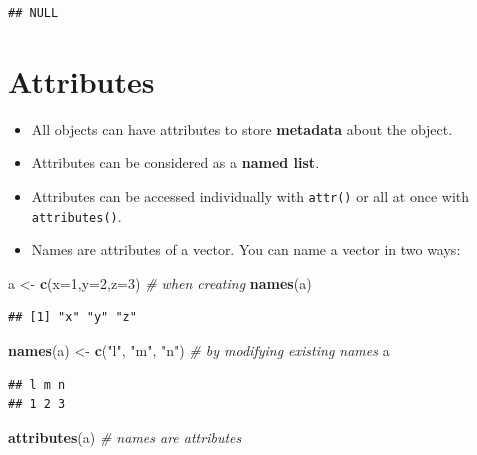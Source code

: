 \documentclass[]{book}
\newenvironment{Shaded}{\begin{snugshade}}{\end{snugshade}}
\newcommand{\CommentTok}[1]{\textcolor[rgb]{0.56,0.35,0.01}{\textit{#1}}}
\newcommand{\DataTypeTok}[1]{\textcolor[rgb]{0.13,0.29,0.53}{#1}}
\newcommand{\DecValTok}[1]{\textcolor[rgb]{0.00,0.00,0.81}{#1}}
\newcommand{\KeywordTok}[1]{\textcolor[rgb]{0.13,0.29,0.53}{\textbf{#1}}}
\newcommand{\NormalTok}[1]{#1}
\newcommand{\StringTok}[1]{\textcolor[rgb]{0.31,0.60,0.02}{#1}}
\providecommand{\tightlist}{%
  \setlength{\itemsep}{0pt}\setlength{\parskip}{0pt}}
\begin{document}
\begin{verbatim}
## NULL
\end{verbatim}

\hypertarget{attributes}{%
\section{Attributes}\label{attributes}}

\begin{itemize}
\tightlist
\item
  All objects can have attributes to store \textbf{metadata} about the object.
\item
  Attributes can be considered as a \textbf{named list}.
\item
  Attributes can be accessed individually with \texttt{attr()} or all at once with \texttt{attributes()}.
\item
  Names are attributes of a vector. You can name a vector in two ways:
\end{itemize}

\begin{Shaded}
\begin{Highlighting}[]
\NormalTok{a <-}\StringTok{ }\KeywordTok{c}\NormalTok{(}\DataTypeTok{x=}\DecValTok{1}\NormalTok{,}\DataTypeTok{y=}\DecValTok{2}\NormalTok{,}\DataTypeTok{z=}\DecValTok{3}\NormalTok{)   }\CommentTok{# when creating}
\KeywordTok{names}\NormalTok{(a)}
\end{Highlighting}
\end{Shaded}

\begin{verbatim}
## [1] "x" "y" "z"
\end{verbatim}

\begin{Shaded}
\begin{Highlighting}[]
\KeywordTok{names}\NormalTok{(a) <-}\StringTok{ }\KeywordTok{c}\NormalTok{(}\StringTok{"l"}\NormalTok{, }\StringTok{"m"}\NormalTok{, }\StringTok{"n"}\NormalTok{)   }\CommentTok{# by modifying existing names}
\NormalTok{a}
\end{Highlighting}
\end{Shaded}

\begin{verbatim}
## l m n 
## 1 2 3
\end{verbatim}

\begin{Shaded}
\begin{Highlighting}[]
\KeywordTok{attributes}\NormalTok{(a)    }\CommentTok{# names are attributes}
\end{Highlighting}
\end{Shaded}
\end{document}
